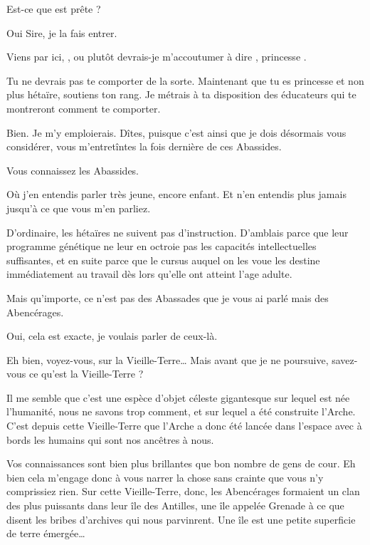 \begin{drama}

  \elenaspeaks Est-ce que \ela est prête ?

  \alexasspeaks Oui Sire, je la fais entrer.

  \intrat{\ela}
  \exit{\alexas{}}

  \elenaspeaks Viens par ici, \ela, ou plutôt devrais-je m’accoutumer à dire \princesse, princesse \princesse.



  Tu ne devrais pas te comporter de la sorte. Maintenant que tu es princesse et non plus hétaïre, soutiens ton rang. Je métrais à ta disposition des éducateurs qui te montreront comment te comporter.

  \elaspeaks Bien. Je m’y emploierais. Dîtes,  puisque c’est ainsi que je dois désormais vous considérer, vous m’entretîntes la fois dernière de ces Abassides.

  \elenaspeaks {} Vous connaissez les Abassides.

  \elaspeaks Où j’en entendis parler très jeune, encore enfant. Et n’en entendis plus jamais jusqu’à ce que vous m’en parliez.

  \elenaspeaks D’ordinaire, les hétaïres ne suivent pas d’instruction. D’amblais parce que leur programme génétique ne leur en octroie pas les capacités intellectuelles suffisantes, et en suite parce que le cursus auquel on les voue les destine immédiatement au travail dès lors qu’elle ont atteint l’age adulte.

  Mais qu’importe, ce n’est pas des Abassades que je vous ai parlé mais des Abencérages.

  \elaspeaks Oui, cela est exacte, je voulais parler de ceux-là.


  \elenaspeaks Eh bien, voyez-vous, sur la Vieille-Terre… Mais avant que je ne poursuive, savez-vous ce qu’est la Vieille-Terre ?

  \elaspeaks Il me semble que c’est une espèce d’objet céleste gigantesque sur lequel est née l’humanité, nous ne savons trop comment, et sur lequel a été construite l’Arche. C’est depuis cette Vieille-Terre que l’Arche a donc été lancée dans l’espace avec à bords les humains qui sont nos ancêtres à nous.

  \elenaspeaks Vos connaissances sont bien plus brillantes que bon nombre de gens de cour. Eh bien cela m’engage donc à vous narrer la chose sans crainte que vous n’y comprissiez rien.
  Sur cette Vieille-Terre, donc, les Abencérages formaient un clan des plus puissants dans leur île des Antilles, une île appelée Grenade à ce que disent les bribes d’archives qui nous parvinrent. Une île est une petite superficie de terre émergée…


\end{drama}
